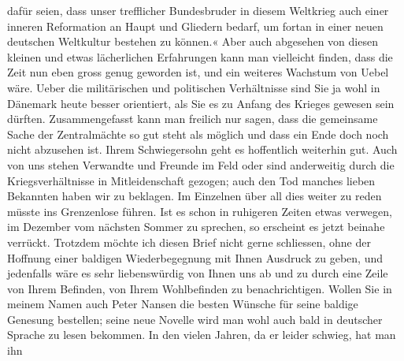 \begin{ledgroupsized}[t]{13cm}
                  dafür seien, dass unser trefflicher Bundesbruder in diesem Weltkrieg auch einer
                  inneren Reformation an Haupt und Gliedern bedarf, um fortan in einer neuen
                  deutschen Weltkultur bestehen zu können.«\pend
           \pstart
           Aber auch abgesehen von diesen kleinen und etwas lächerlichen Erfahrungen kann man
               vielleicht finden, dass die Zeit nun eben gross genug geworden ist, und ein weiteres
               Wachstum von Uebel wäre. Ueber die militärischen und politischen Verhältnisse sind
               Sie ja wohl in Dänemark heute besser orientiert,
               als Sie es zu Anfang des Krieges gewesen \introOben{}sein\introOben{} dürften.
               Zusammengefasst kann man freilich nur sagen, dass die gemeinsame Sache der
               Zentralmächte so gut steht als möglich und dass ein Ende doch noch nicht abzusehen
               ist. Ihrem Schwiegersohn geht es
               hoffentlich weiterhin gut. Auch von uns stehen Verwandte und Freunde im Feld oder
               sind anderweitig durch die Kriegsverhältnisse in Mitleidenschaft gezogen; auch den
               Tod manches lieben {\pb}Bekannten haben wir zu
               beklagen. Im Einzelnen über all dies weiter zu reden müsste ins Grenzenlose führen.
               Ist es schon in ruhigeren Zeiten etwas verwegen, im Dezember vom nächsten Sommer zu
               sprechen, so erscheint es jetzt beinahe verrückt. Trotzdem möchte ich diesen Brief
               nicht gerne schliessen, ohne der Hoffnung einer baldigen Wiederbegegnung mit Ihnen
               Ausdruck zu geben, und jedenfalls wäre es sehr liebenswürdig von Ihnen uns ab und zu
               durch eine Zeile von Ihrem Befinden, von Ihrem Wohlbefinden zu benachrichtigen.
               Wollen Sie in meinem Namen auch Peter Nansen die
               besten Wünsche für seine baldige Genesung bestellen; seine neue Novelle wird man wohl auch bald in deutscher
               Sprache zu lesen bekommen. In den vielen Jahren, da er leider schwieg, hat man ihn

\end{ledgroupsized}
